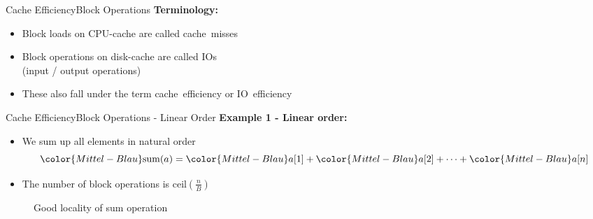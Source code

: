 
\begin{frame}{Cache Efficiency}{Block Operations}
  \textbf{Terminology:}
  \begin{itemize}
    \item<2->
      Block loads on CPU-cache are called {\color{Mittel-Blau}cache~misses}
    \item<3->
      Block operations on disk-cache are called {\color{Mittel-Blau}IOs}\\
      (input / output operations)
    \item<4->
      These also fall under the term {\color{Mittel-Blau}cache~efficiency} or
      {\color{Mittel-Blau}IO~efficiency}
  \end{itemize}
\end{frame}


\begin{frame}{Cache Efficiency}{Block Operations - Linear Order}
  \vspace{-1.0em}
  \textbf{Example 1 - Linear order:}
  \begin{itemize}
    \item<2->
      We sum up all elements in {\color{Mittel-Blau}natural order}
      \begin{displaymath}
        {\color{Mittel-Blau}\mathrm{sum}(a)} =
        {\color{Mittel-Blau}a[1]} +
        {\color{Mittel-Blau}a[2]} +
        \dots +
        {\color{Mittel-Blau}a[n]}
      \end{displaymath}
    \item<3->
      The number of block operations is
      {\color{Mittel-Blau}$\mathrm{ceil}\left(\frac{n}{B}\right)$}
  \end{itemize}
  \vspace{-1.0em}
  \begin{figure}%
    \begin{adjustbox}{width=\linewidth}%
    \end{adjustbox}%
    \caption{Good locality of sum operation}
    \label{fig:caching:memory_locality_linear}
  \end{figure}%
\end{frame}


